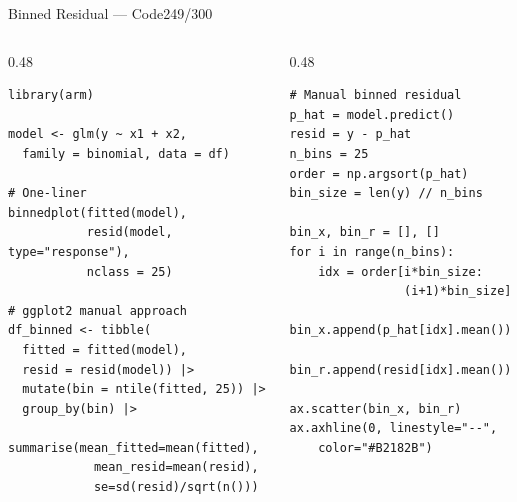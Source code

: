 \documentclass[10pt]{beamer}
\newcommand{\smark}[1]{\hfill{\scriptsize\color{codegray}#1}}
\begin{document}
\begin{frame}[fragile]{Binned Residual --- Code}\smark{249/300}
\begin{columns}[T]
\begin{column}{0.48\textwidth}
\begin{lstlisting}[style=Rstyle]
library(arm)

model <- glm(y ~ x1 + x2,
  family = binomial, data = df)

# One-liner
binnedplot(fitted(model),
           resid(model, type="response"),
           nclass = 25)

# ggplot2 manual approach
df_binned <- tibble(
  fitted = fitted(model),
  resid = resid(model)) |>
  mutate(bin = ntile(fitted, 25)) |>
  group_by(bin) |>
  summarise(mean_fitted=mean(fitted),
            mean_resid=mean(resid),
            se=sd(resid)/sqrt(n()))
\end{lstlisting}
\end{column}
\begin{column}{0.48\textwidth}
\begin{lstlisting}[style=Pystyle]
# Manual binned residual
p_hat = model.predict()
resid = y - p_hat
n_bins = 25
order = np.argsort(p_hat)
bin_size = len(y) // n_bins

bin_x, bin_r = [], []
for i in range(n_bins):
    idx = order[i*bin_size:
                (i+1)*bin_size]
    bin_x.append(p_hat[idx].mean())
    bin_r.append(resid[idx].mean())

ax.scatter(bin_x, bin_r)
ax.axhline(0, linestyle="--",
    color="#B2182B")
\end{lstlisting}
\end{column}
\end{columns}
\end{frame}
\end{document}

